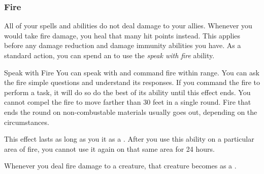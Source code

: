         \subsubsection{Fire}
             All of your  spells and abilities do not deal damage to your allies.
             Whenever you would take fire damage, you heal that many hit points instead.
            This applies before any damage reduction and damage immunity abilities you have.
             As a standard action, you can spend an  to use the \textit{speak with fire} ability.
            \begin{ability}{Speak with Fire}
                You can speak with and command fire within \rnglong range.
                You can ask the fire simple questions and understand its responses.
                If you command the fire to perform a task, it will do so do the best of its ability until this effect ends.
                You cannot compel the fire to move farther than 30 feet in a single round.
                Fire that ends the round on non-combustable materials usually goes out, depending on the circumstances.

                This effect lasts as long as you  it as a .
                After you use this ability on a particular area of fire, you cannot use it again on that same area for 24 hours.
            \end{ability}
             Whenever you deal fire damage to a creature, that creature becomes \ignited as a .


